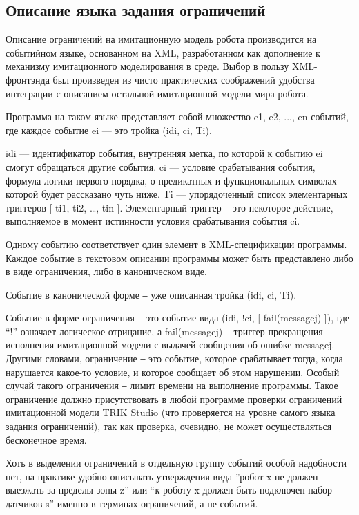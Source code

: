 ﻿\documentclass[conference]{IEEEtran}
\begin{document}
\subsection{Описание языка задания ограничений}
Описание ограничений на имитационную модель робота производится на событийном языке, 
основанном на XML, разработанном как дополнение к механизму имитационного моделирования 
в среде. Выбор в пользу XML-фронтэнда был произведен из чисто практических соображений 
удобства интеграции с описанием остальной имитационной модели мира робота.

Программа на таком языке представляет собой множество { e1, e2, ..., en } событий, где 
каждое событие ei --- это тройка (idi, ci, Ti).

idi --- идентификатор события, внутренняя метка, по которой к событию ei смогут обращаться другие события.
ci --- условие срабатывания события, формула логики первого порядка, о предикатных и функциональных символах которой будет рассказано чуть ниже.
Ti --- упорядоченный список элементарных триггеров [ ti1, ti2, …, tin ]. Элементарный триггер ‒ это некоторое действие, выполняемое в момент истинности условия срабатывания события ci.

Одному событию соответствует один элемент в XML-спецификации программы. Каждое событие 
в текстовом описании программы может быть представлено либо в виде ограничения, либо в каноническом виде.

Событие в канонической форме ‒ уже описанная тройка (idi, ci, Ti).

Событие в форме ограничения ‒ это событие вида (idi, !ci, [ fail(messagej) ]), где “!” означает логическое отрицание, а fail(messagej) ‒ триггер прекращения исполнения имитационной модели с выдачей сообщения об ошибке messagej. Другими словами, ограничение ‒ это событие, которое срабатывает тогда, когда нарушается какое-то условие, и которое сообщает об этом нарушении. Особый случай такого ограничения ‒ лимит времени на выполнение программы. Такое ограничение должно присутствовать в любой программе проверки ограничений имитационной модели TRIK Studio (что проверяется на уровне самого языка задания ограничений), так как проверка, очевидно, не может осуществляться бесконечное время. 

Хоть в выделении ограничений в отдельную группу событий особой надобности нет, на практике удобно описывать утверждения вида ”робот x не должен выезжать за пределы зоны z” или “к роботу x должен быть подключен набор датчиков s” именно в терминах ограничений, а не событий.
\end{document}
